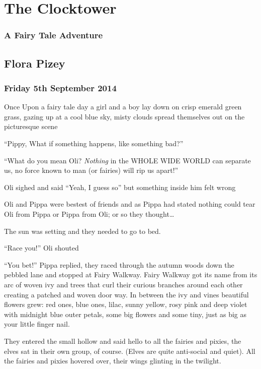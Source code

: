 \section{The Clocktower}\label{the-clocktower}

\subsubsection{A Fairy Tale Adventure}\label{a-fairy-tale-adventure}

\subsection{Flora Pizey}\label{flora-pizey}

\subsubsection{Friday 5th September
2014}\label{friday-5th-september-2014}

Once Upon a fairy tale day a girl and a boy lay down on crisp emerald
green grass, gazing up at a cool blue sky, misty clouds spread
themselves out on the picturesque scene

``Pippy, What if something happens, like something bad?''

``What do you mean Oli? \emph{Nothing} in the WHOLE WIDE WORLD can
separate us, no force known to man (or fairies) will rip us apart!''

Oli sighed and said ``Yeah, I guess so'' but something inside him felt
wrong

Oli and Pippa were bestest of friends and as Pippa had stated nothing
could tear Oli from Pippa or Pippa from Oli; or so they thought\ldots{}

The sun was setting and they needed to go to bed.

``Race you!'' Oli shouted

``You bet!'' Pippa replied, they raced through the autumn woods down the
pebbled lane and stopped at Fairy Walkway. Fairy Walkway got its name
from its arc of woven ivy and trees that curl their curious branches
around each other creating a patched and woven door way. In between the
ivy and vines beautiful flowers grew: red ones, blue ones, lilac, sunny
yellow, rosy pink and deep violet with midnight blue outer petals, some
big flowers and some tiny, just as big as your little finger nail.

They entered the small hollow and said hello to all the fairies and
pixies, the elves sat in their own group, of course. (Elves are quite
anti-social and quiet). All the fairies and pixies hovered over, their
wings glinting in the twilight.

